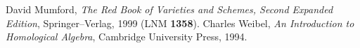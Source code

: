 \documentclass[12pt]{article}
\begin{document}
\begin{thebibliography}{9}
 David Mumford, \emph{The Red Book of Varieties and
Schemes, Second Expanded Edition}, Springer--Verlag, 1999 (LNM {\bf
1358}).
 Charles Weibel, \emph{An Introduction to Homological
Algebra}, Cambridge University Press, 1994.
\end{thebibliography}

\end{document}
